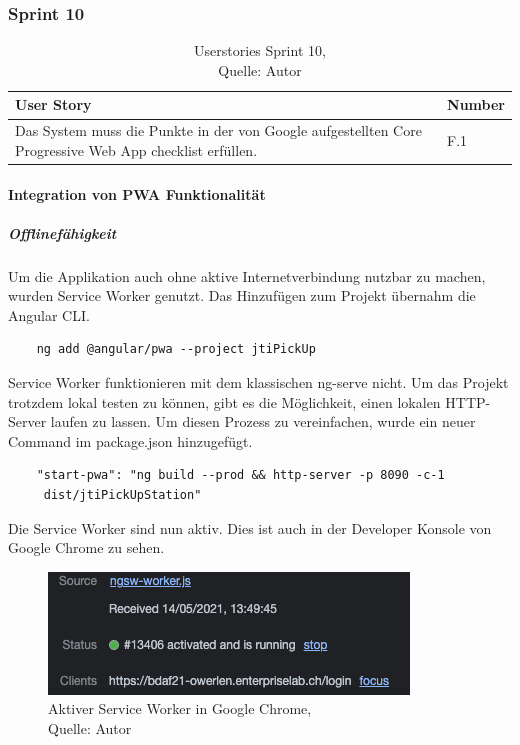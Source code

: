 \subsubsection{Sprint 10}
\begin{table}[H]
	\setlength\extrarowheight{2pt} %
	\begin{tabularx}{\textwidth}{|X|l|}
		\hline
		\textbf{User Story} & \textbf{Number} \\
		\hline
		Das System muss die Punkte in der von Google aufgestellten Core Progressive Web App checklist erfüllen. & F.1\\
		\hline
		
		\hline
	\end{tabularx} 
	\caption[Userstories Sprint 10]{Userstories Sprint 10,\\ Quelle: Autor}
\end{table}\label{userStoriesSprint10}
\paragraph{Integration von \gls{PWA} Funktionalität}
\subparagraph{Offlinefähigkeit}
Um die Applikation auch ohne aktive Internetverbindung nutzbar zu machen, wurden Service Worker genutzt. Das Hinzufügen zum Projekt übernahm die Angular CLI. 
\begin{verbatim}
	ng add @angular/pwa --project jtiPickUp
\end{verbatim}
Service Worker funktionieren mit dem klassischen ng-serve nicht. Um das Projekt trotzdem lokal testen zu können, gibt es die Möglichkeit, einen lokalen HTTP-Server laufen zu lassen. Um diesen Prozess zu vereinfachen, wurde ein neuer Command im package.json hinzugefügt. 
\begin{verbatim}
	"start-pwa": "ng build --prod && http-server -p 8090 -c-1
	 dist/jtiPickUpStation"
\end{verbatim}
Die Service Worker sind nun aktiv. Dies ist auch in der Developer Konsole von Google Chrome zu sehen. 
\begin{figure}[H]
	\centering
	\includegraphics[scale=0.6]{images/serviceWorker.PNG}
	\caption[Aktiver Service Worker in Google Chrome]{Aktiver Service Worker in Google Chrome,\\ Quelle: Autor}
	\label{img: serviceWorker}
\end{figure} 

